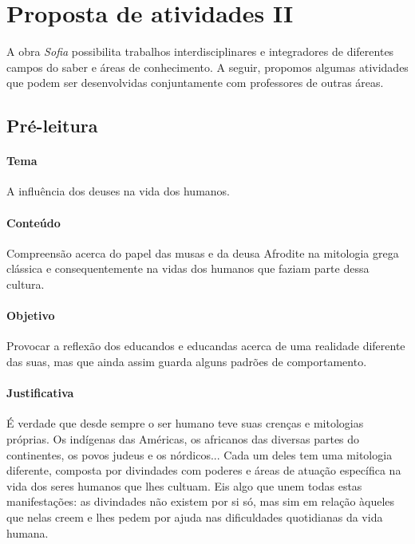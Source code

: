 \documentclass[12pt]{extarticle}
\begin{document}
\section{Proposta de atividades II}


A obra \emph{\textit{Sofia}} possibilita trabalhos interdisciplinares e integradores de
diferentes campos do saber e áreas de conhecimento. A seguir, propomos algumas
atividades que podem ser desenvolvidas conjuntamente com professores de outras
áreas. %


\subsection{Pré-leitura} 

\paragraph{Tema} A influência dos deuses na vida dos humanos.

\paragraph{Conteúdo} Compreensão acerca do papel das musas e da deusa Afrodite
na mitologia grega clássica e consequentemente na vidas dos humanos que faziam parte dessa cultura.

\paragraph{Objetivo} Provocar a reflexão dos educandos e educandas acerca de
uma realidade diferente das suas, mas que ainda assim guarda alguns padrões 
de comportamento. 

\paragraph{Justificativa} É verdade que desde sempre o ser humano teve suas
crenças e mitologias próprias. Os indígenas das Américas, os africanos das diversas
partes do continentes, os povos judeus e os nórdicos... Cada um deles tem uma
mitologia diferente, composta por divindades com poderes e áreas de atuação
específica na vida dos seres humanos que lhes cultuam. Eis algo que unem todas
estas manifestações: as divindades não existem por si só, mas sim em relação 
àqueles que nelas creem e lhes pedem por ajuda nas dificuldades quotidianas da vida
humana. 
\end{document}
